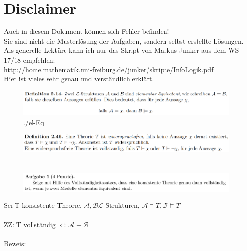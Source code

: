 \documentclass[a4paper]{scrartcl}
\begin{document}
\section*{Disclaimer}%
\label{sec:disclaimer}
Auch in diesem Dokument können sich Fehler befinden!\\
Sie sind nicht die Musterlösung der Aufgaben, sondern selbst erstellte Lösungen.\\

Als generelle Lektüre kann ich nur das Skript von Markus Junker aus dem WS 17/18 empfehlen:\\
\url{http://home.mathematik.uni-freiburg.de/junker/skripte/InfoLogik.pdf}\\
Hier ist vieles sehr genau und verständlich erklärt.%

\begin{figure}[H]
    \centering
    \includegraphics[scale=0.3]{./el-eq.png}
    \caption{./el-Eq}
    \label{fig:./el-eq}
\end{figure}

\begin{figure}[H]
    \centering
    \includegraphics[scale=0.3]{./Vollst.png}
    \label{fig:./Vollständig}
\end{figure}

\section*{}%
\label{sec:aufgabe_1}

    \begin{figure}[H]
        \includegraphics[scale=0.3]{./A-1.png}
        \label{fig:}
    \end{figure}

    Sei T konsistente Theorie, $\mathcal{A},\mathcal{B} \mathscr{L}$-Strukturen, $\mathcal{A} \vDash T, \mathcal{B} \vDash T$\\
    \\\underline{ZZ:} T vollständig $\Leftrightarrow \mathcal{A} \equiv \mathcal{B}$\\
    \\\underline{Beweis:}\\
\end{document}
